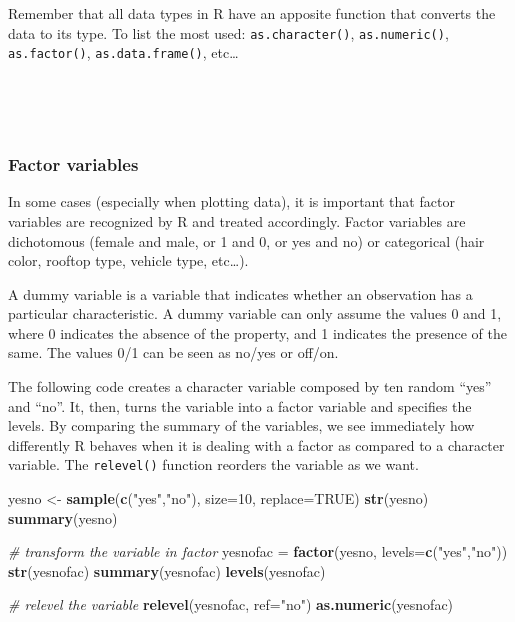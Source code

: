\documentclass[
]{article}
\newenvironment{Shaded}{\begin{snugshade}}{\end{snugshade}}
\newcommand{\AttributeTok}[1]{\textcolor[rgb]{0.13,0.29,0.53}{#1}}
\newcommand{\CommentTok}[1]{\textcolor[rgb]{0.56,0.35,0.01}{\textit{#1}}}
\newcommand{\ConstantTok}[1]{\textcolor[rgb]{0.56,0.35,0.01}{#1}}
\newcommand{\DecValTok}[1]{\textcolor[rgb]{0.00,0.00,0.81}{#1}}
\newcommand{\FunctionTok}[1]{\textcolor[rgb]{0.13,0.29,0.53}{\textbf{#1}}}
\newcommand{\NormalTok}[1]{#1}
\newcommand{\OtherTok}[1]{\textcolor[rgb]{0.56,0.35,0.01}{#1}}
\newcommand{\StringTok}[1]{\textcolor[rgb]{0.31,0.60,0.02}{#1}}
\begin{document}
Remember that all data types in R have an apposite function that
converts the data to its type. To list the most used: \texttt{as.character()},
\texttt{as.numeric()}, \texttt{as.factor()}, \texttt{as.data.frame()}, etc\ldots{}

~

~

\hypertarget{factor-variables}{%
\subsubsection{Factor variables}\label{factor-variables}}

In some cases (especially when plotting data), it is important that
factor variables are recognized by R and treated accordingly. Factor
variables are dichotomous (female and male, or 1 and 0, or yes and no)
or categorical (hair color, rooftop type, vehicle type, etc\ldots).

A dummy variable is a variable that indicates whether an observation has
a particular characteristic. A dummy variable can only assume the values
0 and 1, where 0 indicates the absence of the property, and 1 indicates
the presence of the same. The values 0/1 can be seen as no/yes or
off/on.

The following code creates a character variable composed by ten random
``yes'' and ``no''. It, then, turns the variable into a factor variable and
specifies the levels. By comparing the summary of the variables, we see
immediately how differently R behaves when it is dealing with a factor
as compared to a character variable. The \texttt{relevel()} function reorders
the variable as we want.

\begin{Shaded}
\begin{Highlighting}[]
\NormalTok{yesno }\OtherTok{\textless{}{-}} \FunctionTok{sample}\NormalTok{(}\FunctionTok{c}\NormalTok{(}\StringTok{"yes"}\NormalTok{,}\StringTok{"no"}\NormalTok{), }\AttributeTok{size=}\DecValTok{10}\NormalTok{, }\AttributeTok{replace=}\ConstantTok{TRUE}\NormalTok{)}
\FunctionTok{str}\NormalTok{(yesno)}
\FunctionTok{summary}\NormalTok{(yesno)}

\CommentTok{\# transform the variable in factor}
\NormalTok{yesnofac }\OtherTok{=} \FunctionTok{factor}\NormalTok{(yesno, }\AttributeTok{levels=}\FunctionTok{c}\NormalTok{(}\StringTok{"yes"}\NormalTok{,}\StringTok{"no"}\NormalTok{))}
\FunctionTok{str}\NormalTok{(yesnofac)}
\FunctionTok{summary}\NormalTok{(yesnofac)}
\FunctionTok{levels}\NormalTok{(yesnofac)}

\CommentTok{\# relevel the variable}
\FunctionTok{relevel}\NormalTok{(yesnofac, }\AttributeTok{ref=}\StringTok{"no"}\NormalTok{)}
\FunctionTok{as.numeric}\NormalTok{(yesnofac)}
\end{Highlighting}
\end{Shaded}
\end{document}
